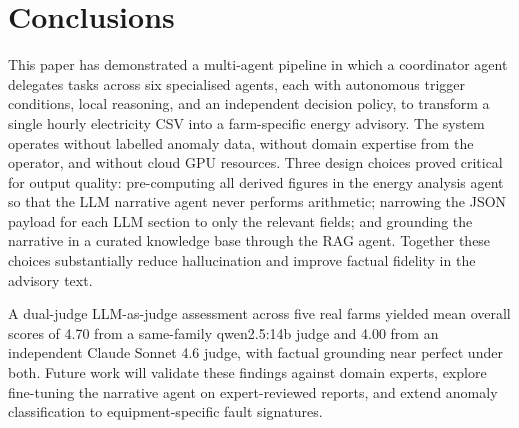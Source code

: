 \documentclass[runningheads]{llncs}
\begin{document}
\section{Conclusions}
\label{sec:conclusions}

This paper has demonstrated a multi-agent pipeline in which a coordinator
agent delegates tasks across six specialised agents, each with autonomous
trigger conditions, local reasoning, and an independent decision policy, to
transform a single hourly electricity CSV into a farm-specific energy
advisory. The
system operates without labelled anomaly data, without domain expertise from
the operator, and without cloud GPU resources. Three design choices proved
critical for output quality: pre-computing all derived figures in the energy
analysis agent so that the LLM narrative agent never performs arithmetic;
narrowing the JSON payload for each LLM section to only the relevant fields;
and grounding the narrative in a curated knowledge base through the RAG agent.
Together these choices substantially reduce hallucination and improve factual
fidelity in the advisory text.

A dual-judge LLM-as-judge assessment across five real farms yielded mean
overall scores of 4.70 from a same-family qwen2.5:14b judge and 4.00 from an
independent Claude Sonnet 4.6 judge, with factual grounding near perfect
under both. Future work will validate these findings against domain experts,
explore fine-tuning the narrative agent on expert-reviewed reports, and
extend anomaly classification to equipment-specific fault signatures.

\end{document}
